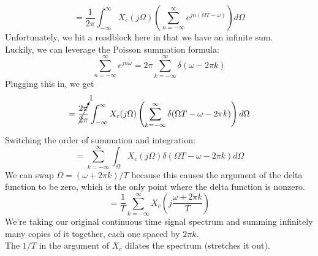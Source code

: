 \documentclass[12pt]{article}
\begin{document}
\begin{equation*}
    = \frac{1}{2 \pi} \int_{-\infty}^{\infty} X_c(j \Omega) \left(\sum_{n=-\infty}^{\infty} e^{j n(\Omega T - \omega)}\right) d\Omega
\end{equation*}
Unfortunately, we hit a roadblock here in that we have an infinite sum. \\
Luckily, we can leverage the Poisson summation formula: \\
\begin{equation}
    \sum_{n=-\infty}^{\infty} e^{jn\omega} = 2\pi \sum_{k=-\infty}^{\infty} \delta(\omega-2 \pi k)
\end{equation}
Plugging this in, we get
\begin{equation*}
    = \cancelto{1}{\frac{2 \pi}{2 \pi}} \int_{-\infty}^{\infty} X_c(j \Omega) \left( \sum_{k=-\infty}^{\infty} \delta(\Omega T - \omega - 2 \pi k)\right) d\Omega
\end{equation*}
Switching the order of summation and integration: \\
\begin{equation*}
     = \sum_{k=-\infty}^{\infty} \int_{\Omega}^{} X_c(j \Omega) \delta(\Omega T - \omega - 2 \pi k) d\Omega
\end{equation*}
We can swap $\Omega = (\omega + 2 \pi k)/T$ because this causes the argument of the delta function to be zero, which is the only point where the delta function is nonzero. \\
\begin{equation}
    = \frac{1}{T} \sum_{k=-\infty}^{\infty} X_c\left(j \frac{\omega + 2\pi k}{T}\right)
\end{equation}
We're taking our original continuous time signal spectrum and summing infinitely many copies of it together, each one spaced by $2 \pi k$. \\
The $1/T$ in the argument of $X_c$ dilates the spectrum (stretches it out). \\
\end{document}
